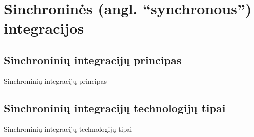 \section{Sinchroninės (angl. “synchronous”) integracijos}

\subsection{Sinchroninių integracijų principas}
Sinchroninių integracijų principas
\subsection{Sinchroninių integracijų technologijų tipai}
Sinchroninių integracijų technologijų tipai

